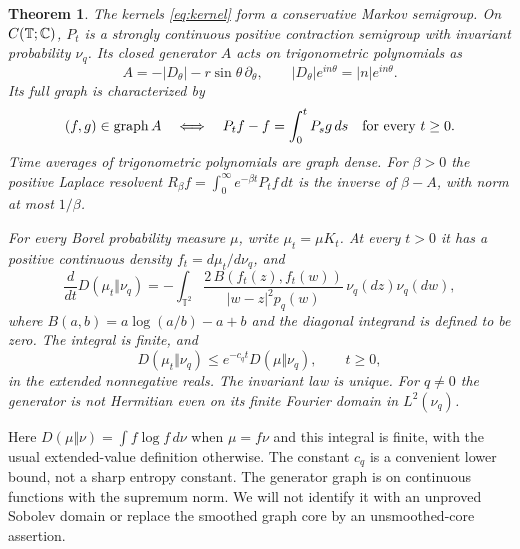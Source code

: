 \documentclass[11pt]{article}
\newtheorem{theorem}{Theorem}[section]
\newcommand{\T}{\mathbb T}\newcommand{\D}{\mathbb D}
\begin{document}
\begin{theorem}\label{thm:main}
The kernels \eqref{eq:kernel} form a conservative Markov
semigroup. On $C(\T;\C)$, $P_t$ is a strongly continuous
positive contraction semigroup with invariant probability
$\nu_q$. Its closed generator $A$ acts on trigonometric
polynomials as
\begin{equation}\label{eq:generator}
 A=-|D_\theta|-r\sin\theta\,\partial_\theta,
 \qquad |D_\theta|e^{in\theta}=|n|e^{in\theta}.
\end{equation}
Its full graph is characterized by
\begin{equation}\label{eq:graph}
 (f,g)\in\operatorname{graph}A
 \quad\Longleftrightarrow\quad
 P_tf-f=\int_0^tP_sg\,ds\quad\hbox{for every }t\geq0.
\end{equation}
Time averages of trigonometric polynomials are graph
dense. For $\beta>0$ the positive Laplace resolvent
$R_\beta f=\int_0^\infty e^{-\beta t}P_tf\,dt$
is the inverse of $\beta-A$, with norm at most $1/\beta$.

For every Borel probability measure $\mu$, write
$\mu_t=\mu K_t$. At every $t>0$ it has a positive
continuous density $f_t=d\mu_t/d\nu_q$, and
\begin{equation}\label{eq:entropyderivative}
 \frac{d}{dt}D(\mu_t\Vert\nu_q)
 =-\int_{\T^2}\frac{2\,B(f_t(z),f_t(w))}
 {|w-z|^2p_q(w)}\,\nu_q(dz)\nu_q(dw),
\end{equation}
where $B(a,b)=a\log(a/b)-a+b$ and the diagonal integrand
is defined to be zero. The integral is finite, and
\begin{equation}\label{eq:entropybound}
 D(\mu_t\Vert\nu_q)\leq e^{-c_qt}D(\mu\Vert\nu_q),
 \qquad t\geq0,
\end{equation}
in the extended nonnegative reals. The invariant law is
unique. For $q\ne0$ the generator is not Hermitian even
on its finite Fourier domain in $L^2(\nu_q)$.
\end{theorem}

Here $D(\mu\Vert\nu)=\int f\log f\,d\nu$ when
$\mu=f\nu$ and this integral is finite, with the usual
extended-value definition otherwise. The constant $c_q$
is a convenient lower bound, not a sharp entropy constant.
The generator graph is on continuous functions with the
supremum norm. We will not identify it with an unproved
Sobolev domain or replace the smoothed graph core by an
unsmoothed-core assertion.
\end{document}
